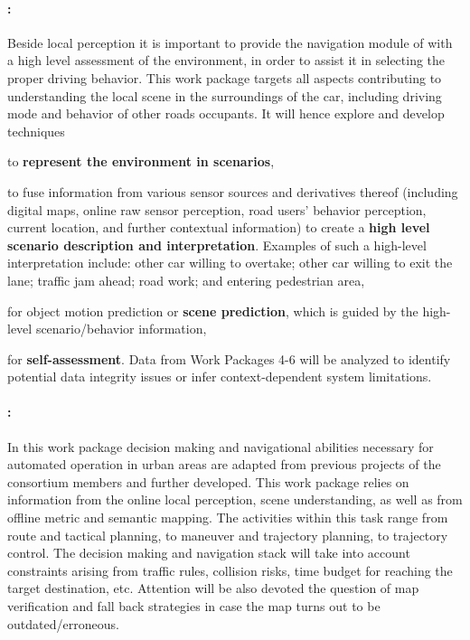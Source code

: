 \paragraph{\textbf{\WPSceneUnderstanding: \WPSceneUnderstandingTitle}}
Beside local perception it is important to provide the navigation module of \WPNavigation with a high level assessment of the environment, in order to assist it in selecting the proper driving behavior. This work package targets all aspects contributing to understanding the local scene in the surroundings of the car, including driving mode and behavior of other roads occupants. It will hence explore and develop techniques
\begin{denseItemize}
\item to \textbf{represent the environment in scenarios},
\item to fuse information from various \Project{} sensor sources and derivatives thereof (including digital maps, online raw sensor perception, road users' behavior perception, current location, and further contextual information) to create a \textbf{high level scenario description and interpretation}. Examples of such a high-level interpretation include: other car willing to overtake; other car willing to exit the lane; traffic jam ahead; road work; and entering pedestrian area,
\item for object motion prediction or \textbf{scene prediction}, which is guided by the high-level scenario/behavior information,
\item for \textbf{self-assessment}. Data from Work Packages 4-6 will be analyzed to identify potential data integrity issues or infer context-dependent system limitations.
\end{denseItemize}


\paragraph{\textbf{\WPNavigation: \WPNavigationTitle}}
In this work package decision making and navigational abilities necessary for automated operation in urban areas are adapted from previous projects of the consortium members and further developed. This work package relies on information from the online local perception, scene understanding, as well as from offline metric and semantic mapping. The activities within this task range from route and tactical planning, to maneuver and trajectory planning, to trajectory control. The decision making and navigation stack will take into account constraints arising from traffic rules, collision risks, time budget for reaching the target destination, etc. Attention will be also devoted the question of map verification and fall back strategies in case the map turns out to be outdated/erroneous.


